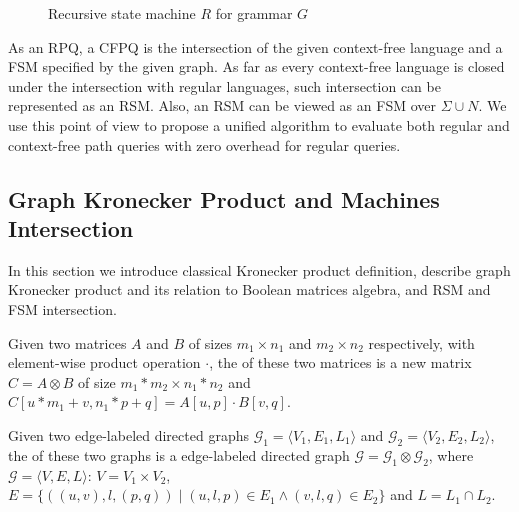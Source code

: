 \begin{figure}[h]
    \centering
    \caption{Recursive state machine $R$ for grammar $G$}
    \label{example:automata}
\end{figure}


As an RPQ, a CFPQ is the intersection of the given context-free language and a FSM specified by the given graph.
As far as every context-free language is closed under the intersection with regular languages, such intersection can be represented as an RSM.
Also, an RSM can be viewed as an FSM over $\Sigma \cup N$.
We use this point of view to propose a unified algorithm to evaluate both regular and context-free path queries with zero overhead for regular queries.

\subsection{Graph Kronecker Product and Machines Intersection}

In this section we introduce classical Kronecker product definition,
describe graph Kronecker product and its relation to Boolean matrices algebra,
and RSM and FSM intersection.

\begin{definition}
Given two matrices $A$ and $B$ of sizes $m_1 \times n_1$ and $m_2 \times n_2$
respectively, with element-wise product operation $\cdot$, the  of these two matrices is a new matrix $C = A \otimes B$ of size $m_1 * m_2 \times n_1 * n_2$ and $C[u * m_1 + v,n_1 * p + q] = A[u,p] \cdot B[v,q]$.
\end{definition}

\begin{definition}
\label{def:graph:product}
Given two edge-labeled directed graphs $\mathcal{G}_1=\langle V_1, E_1, L_1 \rangle$
and $\mathcal{G}_2=\langle V_2, E_2, L_2 \rangle$,
the  of these two graphs is a edge-labeled directed graph
$\mathcal{G}=\mathcal{G}_1 \otimes \mathcal{G}_2$,
where $\mathcal{G}= \langle V, E, L \rangle$:  $V = V_1 \times V_2$, $E = \{((u,v),l,(p,q)) \mid (u,l,p) \in E_1 \wedge (v,l,q) \in E_2 \}$ and $L = L_1 \cap L_2$.
\end{definition}

